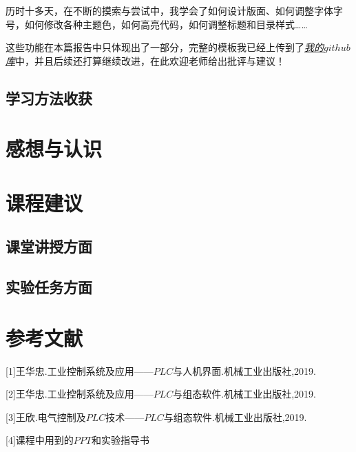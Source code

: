 \documentclass[12pt]{ctexart}
\begin{document}
历时十多天，在不断的摸索与尝试中，我学会了如何设计版面、如何调整字体字号，如何修改各种主题色，如何高亮代码，如何调整标题和目录样式……

这些功能在本篇报告中只体现出了一部分，完整的模板我已经上传到了\href{https://github.com/brebalance/NKU-LaTeX-template.git}{\textit{我的$github$库}}中，并且后续还打算继续改进，在此欢迎老师给出批评与建议！

\subsection{学习方法收获}

\lipsum[1]

\section{感想与认识}

\lipsum[1]
\lipsum[1]
\lipsum[1]

\section{课程建议}

\lipsum[1]

\subsection{课堂讲授方面}

\lipsum[1]
\lipsum[1]

\subsection{实验任务方面}

\lipsum[1]
\lipsum[1]


\clearpage	
\section{参考文献}

\begin{flushleft}

[1]王华忠.工业控制系统及应用——$PLC$与人机界面.机械工业出版社,2019.

[2]王华忠.工业控制系统及应用——$PLC$与组态软件.机械工业出版社,2019.

[3]王欣.电气控制及$PLC$技术——$PLC$与组态软件.机械工业出版社,2019.

[4]课程中用到的$PPT$和实验指导书

\end{flushleft}
\end{document}
